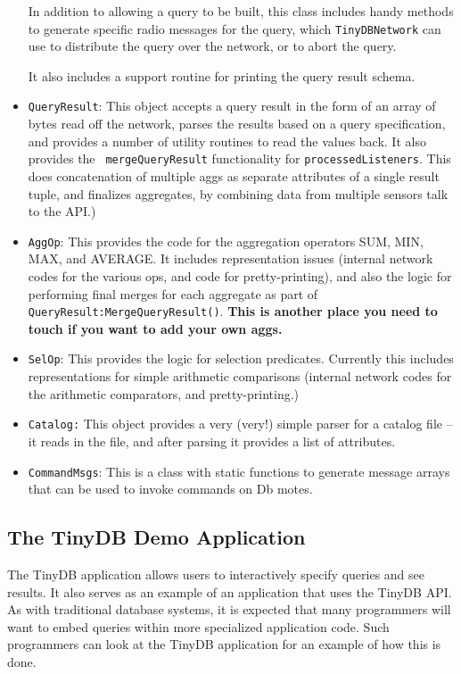 \documentclass[11pt]{article}
\begin{document}
\begin{itemize}
   In addition to allowing a query to be built, this class includes
   handy methods to generate specific radio messages for the query,
   which {\tt TinyDBNetwork} can use to distribute the query over the
   network, or to abort the query.

   It also includes a support routine for printing the query result
   schema.

\item {\tt QueryResult}: This object accepts a query result in the
    form of an array of bytes read off the network, parses the results
    based on a query specification, and provides a number of utility
    routines to read the values back.  It also provides the {\tt
    mergeQueryResult} functionality for {\tt processedListeners}.
    This does concatenation of multiple aggs as separate attributes of
    a single result tuple, and finalizes aggregates, by
    combining data from multiple sensors talk to 
    the API.)

\item {\tt AggOp}: This provides the code for the aggregation
  operators SUM, MIN, MAX, and AVERAGE.  It includes representation
  issues (internal network codes for the various ops, and code for
  pretty-printing), and also the logic for performing final merges for
  each aggregate as part of {\tt QueryResult:MergeQueryResult()}.
  {\bf This is another place you need to touch if you want to add your
  own aggs.}

\item {\tt SelOp}: This provides the logic for selection predicates.
  Currently this includes representations for simple arithmetic
  comparisons (internal network codes for the arithmetic comparators,
  and pretty-printing.)

\item {\tt Catalog:} This object provides a very (very!) simple parser
  for a catalog file -- it reads in the file, and after parsing it
  provides a list of attributes.

\item {\tt CommandMsgs}: This is a class with static functions to
    generate message arrays that can be used to invoke commands on Db
    motes.

\end{itemize}
\subsection{The TinyDB Demo Application}
The TinyDB application allows users to interactively specify queries
and see results.  It also serves as an example of an application that
uses the TinyDB API.  As with traditional database systems, it is
expected that many programmers will want to embed queries within more
specialized application code.  Such programmers can look at the TinyDB
application for an example of how this is done.
\end{document}
